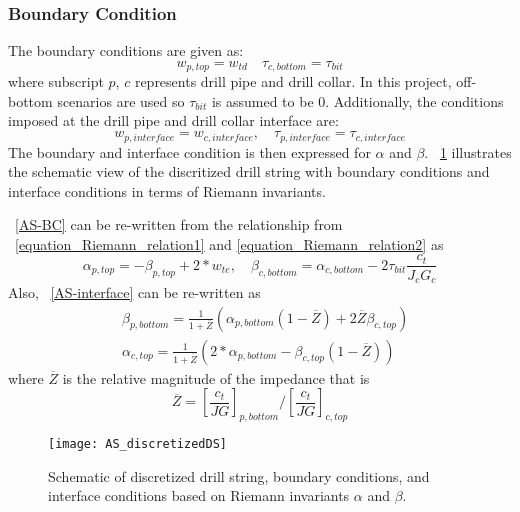 \subsubsection{Boundary Condition}
The boundary conditions are given as:
\begin{equation}\label{AS-BC}
  w_{p,top} = w_{td} \quad \tau_{c,bottom} = \tau_{bit}
\end{equation}
where subscript $p$, $c$ represents drill pipe and drill collar. In this project, off-bottom scenarios are used so $\tau_{bit}$ is assumed to be 0.
Additionally, the conditions imposed at the drill pipe and drill collar interface are:
\begin{equation}\label{AS-interface}
  w_{p,interface} = w_{c,interface}, \quad \tau_{p,interface} = \tau_{c,interface}
\end{equation}
The boundary and interface condition is then expressed for $\alpha$ and $\beta$. \figurename~\ref{AS_discretizeDS} illustrates the schematic view of the discritized drill string with boundary conditions and interface conditions in terms of Riemann invariants.

\equationname~\ref{AS-BC} can be re-written from the relationship from \equationname~\ref{equation_Riemann_relation1} and \ref{equation_Riemann_relation2} as
\begin{equation}\label{AS-riemannBC}
  \alpha_{p,top} = -\beta_{p,top} + 2*w_{te}, \quad \beta_{c,bottom} = \alpha_{c,bottom} - 2\tau_{bit} \frac{c_t}{J_c G_c}
\end{equation}
Also, \equationname~\ref{AS-interface} can be re-written as
\begin{equation}\label{AS-riemanninterface}
\begin{split}
    & \beta_{p,bottom} = \frac{1}{1+\overline{Z}}\left(\alpha_{p,bottom}(1-\overline{Z}) + 2\overline{Z}\beta_{c,top} \right) \\
    & \alpha_{c,top} = \frac{1}{1+\overline{Z}}\left(2*\alpha_{p,bottom} - \beta_{c,top}(1-\overline{Z})\right)
\end{split}
\end{equation}
where $\overline{Z}$ is the relative magnitude of the impedance that is
\begin{equation}\label{AS_Zbar}
  \overline{Z} = \left[\frac{c_t}{JG}\right]_{p,bottom} / \left[\frac{c_t}{JG}\right]_{c,top}
\end{equation}
\begin{figure}
  \centering
  \texttt{[image: AS\_discretizedDS]}
  \caption[Schematic of discretized drill string and boundary conditions]{Schematic of discretized drill string, boundary conditions, and interface conditions based on Riemann invariants $\alpha$ and $\beta$.}\label{AS_discretizeDS}
\end{figure}

